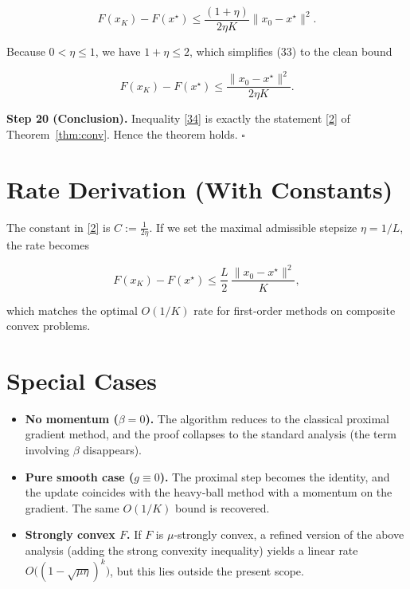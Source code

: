 \documentclass{article}
\begin{document}
\[
F(x_{K})-F(x^{\star})\le \frac{(1+\eta)}{2\eta K}\|x_{0}-x^{\star}\|^{2}.
\tag{33}
\]

Because $0<\eta\le 1$, we have $1+\eta\le 2$, which simplifies (33) to the clean bound  

\[
F(x_{K})-F(x^{\star})\le \frac{\|x_{0}-x^{\star}\|^{2}}{2\eta K}.
\tag{34}
\]

\noindent\textbf{Step 20 (Conclusion).}  
Inequality \eqref{34} is exactly the statement \eqref{2} of Theorem~\ref{thm:conv}. Hence the theorem holds. \hfill $\square$

\section*{Rate Derivation (With Constants)}
The constant in \eqref{2} is $C:=\frac{1}{2\eta}$.  
If we set the maximal admissible stepsize $\eta=1/L$, the rate becomes  

\[
F(x_{K})-F(x^{\star})\le \frac{L}{2}\,\frac{\|x_{0}-x^{\star}\|^{2}}{K},
\]

which matches the optimal $O(1/K)$ rate for first‑order methods on composite convex problems.

\section*{Special Cases}
\begin{itemize}
    \item \textbf{No momentum ($\beta=0$).} The algorithm reduces to the classical proximal gradient method, and the proof collapses to the standard analysis (the term involving $\beta$ disappears).
    \item \textbf{Pure smooth case ($g\equiv0$).} The proximal step becomes the identity, and the update coincides with the heavy‑ball method with a momentum on the gradient. The same $O(1/K)$ bound is recovered.
    \item \textbf{Strongly convex $F$.} If $F$ is $\mu$‑strongly convex, a refined version of the above analysis (adding the strong convexity inequality) yields a linear rate $O\bigl((1-\sqrt{\mu\eta})^{k}\bigr)$, but this lies outside the present scope.
\end{itemize}
\end{document}

